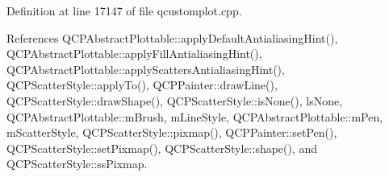 Definition at line 17147 of file qcustomplot.\+cpp.



References Q\+C\+P\+Abstract\+Plottable\+::apply\+Default\+Antialiasing\+Hint(), Q\+C\+P\+Abstract\+Plottable\+::apply\+Fill\+Antialiasing\+Hint(), Q\+C\+P\+Abstract\+Plottable\+::apply\+Scatters\+Antialiasing\+Hint(), Q\+C\+P\+Scatter\+Style\+::apply\+To(), Q\+C\+P\+Painter\+::draw\+Line(), Q\+C\+P\+Scatter\+Style\+::draw\+Shape(), Q\+C\+P\+Scatter\+Style\+::is\+None(), ls\+None, Q\+C\+P\+Abstract\+Plottable\+::m\+Brush, m\+Line\+Style, Q\+C\+P\+Abstract\+Plottable\+::m\+Pen, m\+Scatter\+Style, Q\+C\+P\+Scatter\+Style\+::pixmap(), Q\+C\+P\+Painter\+::set\+Pen(), Q\+C\+P\+Scatter\+Style\+::set\+Pixmap(), Q\+C\+P\+Scatter\+Style\+::shape(), and Q\+C\+P\+Scatter\+Style\+::ss\+Pixmap.


